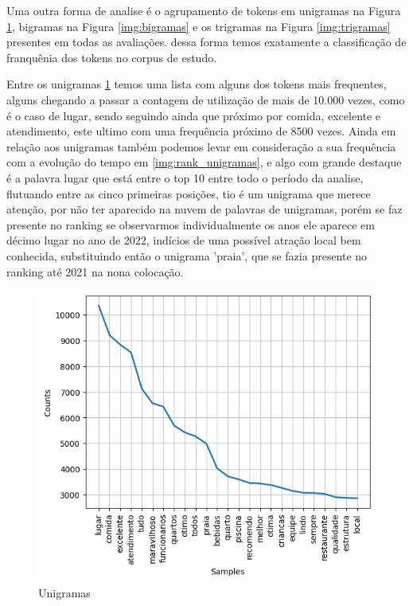 Uma outra forma de analise é o agrupamento de tokens em unigramas na Figura \ref{img:unigramas}, bigramas na Figura \ref{img:bigramas} e os trigramas na Figura \ref{img:trigramas} presentes em todas as avaliações. dessa forma temos exatamente a classificação de franquênia dos tokens no corpus de estudo.

Entre os unigramas \ref{img:unigramas} temos uma lista com alguns dos tokens mais frequentes, alguns chegando a passar a contagem de utilização de mais de 10.000 vezes, como é o caso de lugar, sendo seguindo ainda que próximo por comida, excelente e atendimento, este ultimo com uma frequência próximo de 8500 vezes. Ainda em relação aos unigramas também podemos levar em consideração a sua frequência com a evolução do tempo em \ref{img:rank_unigramas}, e algo com grande destaque é a palavra lugar que está entre o top 10 entre todo o período da analise, flutuando entre as cinco primeiras posições, tio é um unigrama que merece atenção, por não ter aparecido na nuvem de palavras de unigramas, porém se faz presente no ranking se observarmos individualmente os anos ele aparece em décimo lugar no ano de 2022, indícios de uma possível atração local bem conhecida, substituindo então o unigrama 'praia', que se fazia presente no ranking até 2021 na nona colocação.

\begin{figure}
	\centering
	\includegraphics[width=1\textwidth]{figs/exploratoria/unigramas.png}
	\caption{Unigramas}
	\label{img:unigramas}
\end{figure}

